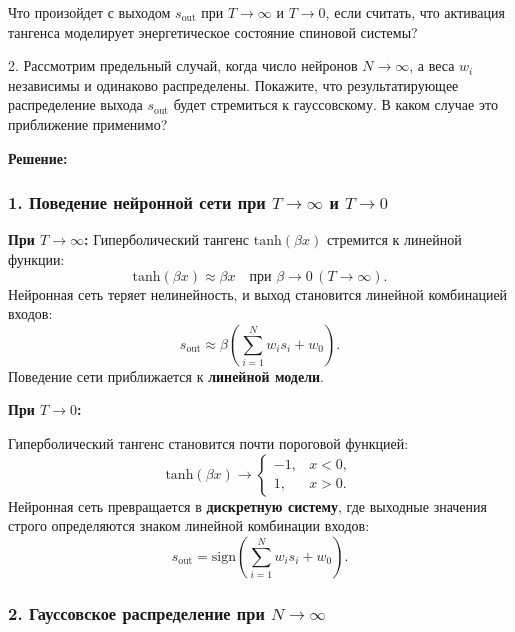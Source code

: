 \begin{description}
Что произойдет с выходом \( s_\text{out} \) при \( T \to \infty \) и \( T \to 0 \), если считать, что активация тангенса моделирует энергетическое состояние спиновой системы? 

2. Рассмотрим предельный случай, когда число нейронов \( N \to \infty \), а веса \( w_i \) независимы и одинаково распределены. Покажите, что результатирующее распределение выхода \( s_\text{out} \) будет стремиться к гауссовскому. В каком случае это приближение применимо?

\textbf{Решение:}

\subsubsection*{1. Поведение нейронной сети при \( T \to \infty \) и \( T \to 0 \)}

\textbf{При \( T \to \infty \):}
Гиперболический тангенс \( \mathrm{tanh}(\beta x) \) стремится к линейной функции:
\[
\mathrm{tanh}(\beta x) \approx \beta x \quad \text{при } \beta \to 0 \, (T \to \infty).
\]
Нейронная сеть теряет нелинейность, и выход становится линейной комбинацией входов:
\[
s_\text{out} \approx \beta \left( \sum_{i=1}^N w_i s_i + w_0 \right).
\]
Поведение сети приближается к \textbf{линейной модели}.

\textbf{При \( T \to 0 \):}

Гиперболический тангенс становится почти пороговой функцией:
\[
\mathrm{tanh}(\beta x) \to 
\begin{cases} 
-1, & x < 0, \\ 
1, & x > 0.
\end{cases}
\]
Нейронная сеть превращается в \textbf{дискретную систему}, где выходные значения строго определяются знаком линейной комбинации входов:
\[
s_\text{out} = \text{sign} \left( \sum_{i=1}^N w_i s_i + w_0 \right).
\]

\subsubsection*{2. Гауссовское распределение при \( N \to \infty \)}


\end{description}
